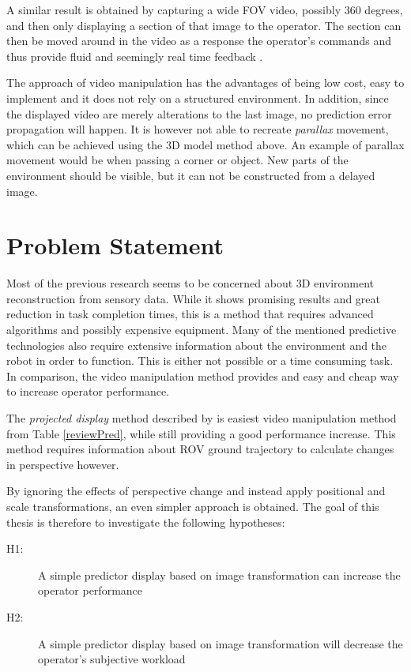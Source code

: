 A similar result is obtained by capturing a wide FOV video, possibly 360 degrees, and then only displaying a section of that image to the operator. The section can then be moved around in the video as a response the operator's commands and thus provide fluid and seemingly real time feedback \citep{Baldwin1999}.

The approach of video manipulation has the advantages of being low cost, easy to implement and it does not rely on a structured environment. In addition, since the displayed video are merely alterations to the last image, no prediction error propagation will happen. It is however not able to recreate \textit{parallax} movement, which can be achieved using the 3D model method above. An example of parallax movement would be when passing a corner or object. New parts of the environment should be visible, but it can not be constructed from a delayed image.

\clearpage
\section{Problem Statement}

Most of the previous research seems to be concerned about 3D environment reconstruction from sensory data. While it shows promising results and great reduction in task completion times, this is a method that requires advanced algorithms and possibly expensive equipment. Many of the mentioned predictive technologies also require extensive information about the environment and the robot in order to function. This is either not possible or a time consuming task. In comparison, the video manipulation method provides and easy and cheap way to increase operator performance.

The \textit{projected display} method described by \citet{Matheson2013} is easiest video manipulation method from Table \ref{reviewPred}, while still providing a good performance increase. This method requires information about ROV ground trajectory to calculate changes in perspective however. 

By ignoring the effects of perspective change and instead apply positional and scale transformations, an even simpler approach is obtained. The goal of this thesis is therefore to investigate the following hypotheses:

\begin{description}
\item[H1:] A simple predictor display based on image transformation can increase the operator performance
 
 \item[H2:] A simple predictor display based on image transformation will decrease the operator's subjective workload
\end{description}
